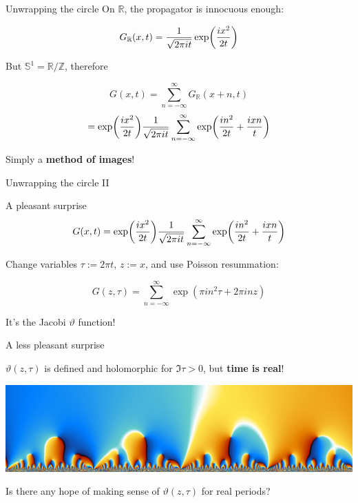\documentclass{beamer}
\begin{document}
\newcommand{\sumZ}{\sum_{n=-\infty}^\infty}

\begin{frame}{Unwrapping the circle}
    On $\mathbb{R}$, the propagator is innocuous enough:

    \begin{equation}
        G_\mathbb{R}(x,t) = {1 \over \sqrt{ 2\pi i t }} \exp(ix^2 \over 2t)
        \label{}
    \end{equation}

    But $\mathbb{S}^1 = \mathbb{R} / \mathbb{Z}$, therefore

    \begin{equation}
        G(x,t) = \sumZ G_\mathbb{R}(x+n,t) 
    \end{equation}
    \begin{equation}
        = \exp(ix^2 \over 2t) {1 \over \sqrt{2\pi i t}} \sumZ \exp( {in^2 \over 2t} + {ixn \over t} )
    \end{equation}

    Simply a \textbf{method of images}!
\end{frame}

\begin{frame}{Unwrapping the circle II}
    \scalebox{0.8}{    }
\end{frame}


\begin{frame}{A pleasant surprise}
    \begin{equation}
   G(x,t) = \exp(ix^2 \over 2t) {1 \over \sqrt{2\pi i t}} \sumZ \exp( {in^2 \over 2t} + {ixn \over t} ) 
   \end{equation}

   Change variables $\tau := 2\pi t$, $z := x$, and use Poisson resummation:

   \begin{equation}
       G(z,\tau) = \sumZ \exp(\pi i n^2 \tau + 2 \pi i n z)
       \label{}
   \end{equation}

   It's the Jacobi $\vartheta$ function!
\end{frame}

\newcommand{\T}{\vartheta}

\begin{frame}{A less pleasant surprise}

    $\T(z,\tau)$ is defined and holomorphic for $\Im \tau > 0$, but \textbf{time is real}!
    
    \vfill

    \includegraphics[width=\textwidth]{images/plots/theta_new}

    \vfill

    Is there any hope of making sense of $\T(z,\tau)$ for real periods?

\end{frame}
\end{document}
